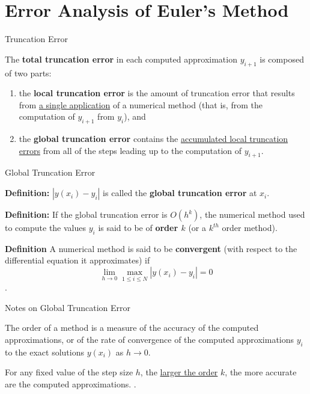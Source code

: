 \documentclass[12pt]{beamer}
\begin{document}
\section{Error Analysis of Euler's Method}

\begin{frame}{Truncation Error}

The {\bf total truncation error} in each computed approximation $y_{i+1}$ is composed of two parts:
\begin{enumerate}
\item{the {\bf local truncation error} is the amount of truncation error that results from \underline{a single application} of a numerical method (that is, from the computation of $y_{i+1}$ from $y_i$), and}
\item{the {\bf global truncation error} contains the \underline{accumulated local truncation errors} from all of the steps leading up to the computation of $y_{i+1}$.}
\end{enumerate}

\end{frame}

\begin{frame}{Global Truncation Error}

{\bf Definition:} $|y(x_i)-y_i|$ is called the {\bf global truncation error} at $x_i$.

\vspace{\baselineskip}

{\bf Definition:} If the global truncation error is $O(h^k)$, the numerical method used to compute the values $y_i$ is said to be of {\bf order $k$} (or a $k^{th}$ order method).

\vspace{\baselineskip}

{\bf Definition} A numerical method is said to be {\bf convergent} (with respect to the differential equation it approximates) if
\[
\lim_{h\to0} \max_{1 \leq i \leq N} |y(x_i)-y_i|=0
\]
				 .
\end{frame}

\begin{frame}{Notes on Global Truncation Error}

The order of a method is a measure of the accuracy of the computed approximations, or of the rate of convergence of the computed approximations $y_i$ to the exact solutions $y(x_i)$ as $h \rightarrow 0$.

\vspace{\baselineskip}

For any fixed value of the step size $h$, the \underline{larger the order} $k$, the more accurate are the computed approximations.
			 .
\end{frame}
\end{document}
